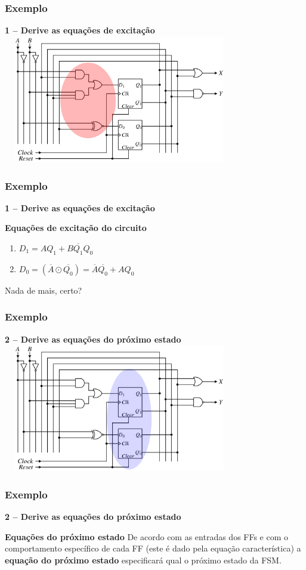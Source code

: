 \documentclass{beamer}
\begin{document}
\begin{frame}
  \frametitle{Exemplo}
  \textbf{1 – Derive as equações de excitação}
   \includegraphics[height = 2.2in, width = 4in]{EXEMPLO_ANALISE_2.png}
\end{frame}

\begin{frame}
  \frametitle{Exemplo}
  \textbf{1 – Derive as equações de excitação}
  \begin{block}{\textbf{Equações de excitação do circuito}}
    \begin{enumerate}
     \item $ D_1 = AQ_1 + B\overline{Q_1}Q_0 $
     \item $ D_0 = (\overline{A}\odot\overline{Q_0}) = \overline{A}\overline{Q_0} + AQ_0 $
    \end{enumerate}
  \end{block}\pause
  Nada de mais, certo?
\end{frame}

\begin{frame}
  \frametitle{Exemplo}
  \textbf{2 – Derive as equações do próximo estado}
   \includegraphics[height = 2.2in, width = 4in]{EXEMPLO_ANALISE_3.png}
\end{frame}

\begin{frame}
  \frametitle{Exemplo}
  \textbf{2 – Derive as equações do próximo estado}
  \begin{block}{\textbf{Equações do próximo estado}}
    De acordo com as entradas dos FFs e com o comportamento específico de cada FF (este é dado pela equação característica) a \textbf{equação do próximo estado} 
    especificará qual o próximo estado da FSM.
  \end{block}
\end{frame}
\end{document}
